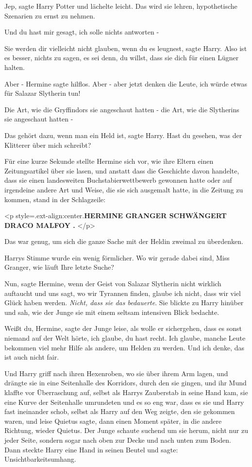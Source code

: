 \glqq Jep\grqq{}, sagte Harry Potter und lächelte leicht. \glqq Das wird sie
lehren, hypothetische Szenarien zu ernst zu nehmen.\grqq{}

\glqq Und du hast mir gesagt, ich solle nichts antworten -\grqq{}

\glqq Sie werden dir vielleicht nicht glauben, wenn du es leugnest\grqq{}, sagte
Harry. \glqq Also ist es besser, nichts zu sagen, es sei denn, du willst, dass
sie dich für einen Lügner halten.\grqq{}

\glqq Aber -\grqq{} Hermine sagte hilflos. \glqq Aber - aber jetzt denken die
Leute, ich würde etwas für Salazar Slytherin tun!\grqq{}

Die Art, wie die Gryffindors sie angeschaut hatten - die Art, wie die Slytherins
sie angeschaut hatten -

\glqq Das gehört dazu, wenn man ein Held ist\grqq{}, sagte Harry. \glqq Hast du
gesehen, was der Klitterer über mich schreibt?\grqq{}

Für eine kurze Sekunde stellte Hermine sich vor, wie ihre Eltern einen
Zeitungsartikel über sie lasen, und anstatt dass die Geschichte davon handelte,
dass sie einen landesweiten Buchstabierwettbewerb gewonnen hatte oder auf
irgendeine andere Art und Weise, die sie sich ausgemalt hatte, in die Zeitung zu
kommen, stand in der Schlagzeile:

<p style=\grqq{}.ext-align:center\grqq{}.\textbf{\glqq HERMINE GRANGER
SCHWÄNGERT DRACO MALFOY \glqq . }</p>

Das war genug, um sich die ganze Sache mit der Heldin zweimal zu überdenken.

Harrys Stimme wurde ein wenig förmlicher. \glqq Wo wir gerade dabei sind, Miss
Granger, wie läuft Ihre letzte Suche?\grqq{}

\glqq Nun\grqq{}, sagte Hermine, \glqq wenn der Geist von Salazar Slytherin
nicht wirklich auftaucht und uns sagt, wo wir Tyrannen finden, glaube ich nicht,
dass wir viel Glück haben werden.\grqq{} \emph{Nicht, dass sie das bedauerte}.
Sie blickte zu Harry hinüber und sah, wie der Junge sie mit einem seltsam
intensiven Blick bedachte.

\glqq Weißt du, Hermine\grqq{}, sagte der Junge leise, als wolle er sichergehen,
dass es sonst niemand auf der Welt hörte, \glqq ich glaube, du hast recht. Ich
glaube, manche Leute bekommen viel mehr Hilfe als andere, um Helden zu werden.
Und ich denke, das ist auch nicht fair.\grqq{}

Und Harry griff nach ihren Hexenroben, wo sie über ihrem Arm lagen, und drängte
sie in eine Seitenhalle des Korridors, durch den sie gingen, und ihr Mund
klaffte vor Überraschung auf, selbst als Harrys Zauberstab in seine Hand kam,
sie eine Kurve der Seitenhalle umrundeten und es so eng war, dass es sie und
Harry fast ineinander schob, selbst als Harry auf den Weg zeigte, den sie
gekommen waren, und leise \glqq Quietus\grqq{} sagte, dann einen Moment später,
in die andere Richtung, wieder \glqq Quietus\grqq{}. Der Junge schaute suchend
um sie herum, nicht nur zu jeder Seite, sondern sogar nach oben zur Decke und
nach unten zum Boden. Dann steckte Harry eine Hand in seinen Beutel und sagte:
\glqq Unsichtbarkeitsumhang.\grqq{}

